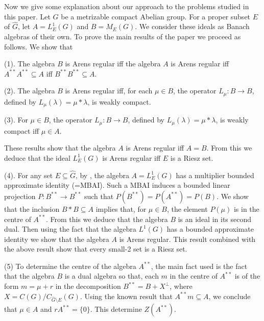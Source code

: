 \documentclass[12pt, twoside, leqno]{article}
\theoremstyle{definition}
\theoremstyle{definition}
\numberwithin{equation}{section}
\begin{document}
Now we give some explanation about our approach to the problems studied in this paper. Let $ G $ be a metrizable compact Abelian group. For a proper subset $ E $ of $ \hat{G} $, let $ A=L^{1}_{E}(G) $ and $ B=M_{E}(G) $.  We consider these ideals as Banach algebras of their own. To prove the main results of the paper we proceed as follows. We show that\vspace{2mm}

(1). The algebra $ B $ is Arens regular iff the algebra $ A $ is Arens regular iff $ A^{**}A^{**}\subseteq A $ iff $ B^{**}B^{**}\subseteq A $.\vspace{2mm}

(2). The algebra $ B $ is Arens regular iff, for each $ \mu\in B $, the operator $ L_{\mu}:B\rightarrow B $, defined by $ L_{\mu}(\lambda)=\mu*\lambda $, is weakly compact.\vspace{2mm}

(3). For $ \mu\in B $, the operator  $ L_{\mu}:B\rightarrow B $, defined by $ L_{\mu}(\lambda)=\mu*\lambda $, is weakly compact iff $ \mu\in A $.\vspace{2mm}

\noindent These results show that the algebra $ A $ is Arens regular iff $ A=B $. From this we deduce that the ideal $ L^{1}_{E}(G) $ is Arens regular iff $ E $ is a Riesz set.\vspace{2mm}

(4). For any set $ E\subseteq\hat{G} $, by \cite [Proposition 1]  {Zhang}, the algebra $ A=L^{1}_{E}(G) $ has a multiplier bounded approximate identity (=MBAI). Such a MBAI induces a bounded linear projection $ P:B^{**}\rightarrow B^{**} $ such that $P(B^{**})=P(A^{**})=P(B)$. We show that the inclusion $ B*B\subseteq A $ implies that, for $\mu\in B$, the element $P(\mu)$ is in the centre of $A^{**}$. From this we deduce that the algebra $B$ is an ideal in its second dual. Then using the fact that the algebra $L^{1}(G)$ has a bounded approximate identity we show that the algebra $A$ is Arens regular. This result combined with the above result show that every small-2 set is a Riesz set.\vspace{2mm}

(5) To determine the centre of the algebra $ A^{**} $, the main fact used is the fact that the algebra $ B $ is a dual algebra so that, each $ m $ in the centre of  $ A^{**} $ is of the form $ m=\mu +r $ in the decomposition $ B^{**}=B+X^{\perp} $, where $ X=C(G)/C_{\hat{G}\setminus E}(G) $. Using the known result that $ A^{**}m\subseteq A $, we conclude that $ \mu\in A $  and $ rA^{**}=\{0\} $. This determine $ Z(A^{**}) $.\vspace{2mm}
\end{document}
